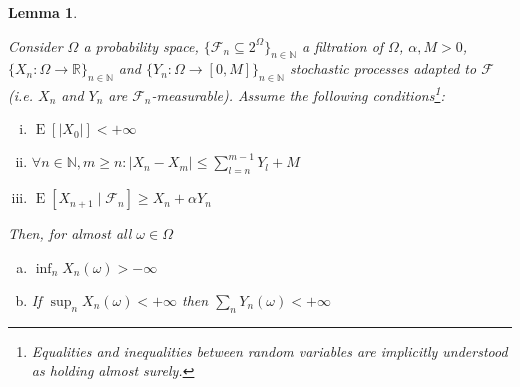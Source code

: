 \documentclass[11pt]{article}
\theoremstyle{definition}
\theoremstyle{plain}
\newtheorem{lemma}{Lemma}%
\newcommand{\Nats}{\mathbb{N}}
\newcommand{\Reals}{\mathbb{R}}
\newcommand{\A}[1]{\lvert #1 \rvert}
\newcommand{\Sq}[2]{\{#1\}_{#2 \in \Nats}}
\newcommand{\Sqn}[1]{\Sq{#1}{n}}
\DeclareMathOperator{\E}{E}
\newcommand{\F}{\mathcal{F}}
\begin{document}
\begin{samepage}
\begin{lemma}
\label{lmm:prudent}

Consider $\Omega$ a probability space, $\Sqn{\F_n \subseteq 2^\Omega}$ a filtration of $\Omega$, $\alpha,M > 0$, $\Sqn{X_n: \Omega \rightarrow \Reals}$ and $\Sqn{Y_n: \Omega \rightarrow [0,M]}$ stochastic processes adapted to $\F$ (i.e. $X_n$ and $Y_n$ are $\F_n$-measurable). Assume the following conditions\footnote{Equalities and inequalities between random variables are implicitly understood as holding almost surely.}:

\begin{enumerate}[i.]

\item $\E[\A{X_0}] < +\infty$
\item $\forall n \in \Nats, m \geq n: \A{X_n - X_m} \leq \sum_{l=n}^{m-1} Y_l + M$
\item $\E[X_{n+1} \mid \F_n] \geq X_n + \alpha Y_n$

\end{enumerate}

Then, for almost all $\omega \in \Omega$

\begin{enumerate}[a.]

\item\label{itm:lmm_prudent__inf} $\inf_n X_n\left(\omega\right) > -\infty$
\item\label{itm:lmm_prudent__sup} If $\sup_n X_n\left(\omega\right) < +\infty$ then $\sum_n Y_n\left(\omega\right) < +\infty$

\end{enumerate}

\end{lemma}
\end{samepage}
\end{document}
